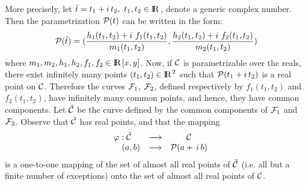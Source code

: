 More precisely, let $\bar{t}=t_1 + i\,t_{2},\,\, t_1,t_2 \in {\rm I\kern -2.2pt R\hskip 1pt}$, denote a 
generic complex number. Then the parametrization ${\cal P}(t)$ can be 
written in the form:
\[ {\cal P}(\tilde{t})=(\frac{h_{1}(t_1,t_2)+i\,\, 
f_{1}(t_1,t_2)}{m_{1}(t_1,t_2)}, \frac{h_{2}(t_1,t_2)+i\,\, 
f_{2}(t_1,t_2)}{m_{2}(t_1,t_2)}) \]
where $m_1,m_2,h_1,h_2,f_1,f_2 \in {\rm I\kern -2.2pt R\hskip 1pt}[x,y]$. Now, if ${\cal C}$ is 
parametrizable over the reals, there exist infinitely many  points 
$(t_1,t_2)\in {\rm I\kern -2.2pt R\hskip 1pt}^{2}$ such that ${\cal P}(t_1+i\,t_{2})$ is a real point 
on ${\cal C}$. Therefore 
the curves ${\cal F}_{1}$, ${\cal F}_{2}$, defined respectively by 
$f_{1}(t_1,t_2)$ and $f_{2}(t_1,t_2)$, have infinitely many common 
points, and hence, they have common components. Let  $\tilde{{\cal C}}$ 
be the curve defined by the common components of ${\cal F}_{1}$ and 
${\cal F}_{2}$. Observe that $\tilde{{\cal C}}$ has  real points, and that 
the mapping 
\[ \begin{array}{ccc}
\varphi:\tilde{{\cal C}} & \longrightarrow & {\cal C} \\ 
\,\,\,\,\,\,\,\,\,\,\,\,(a,b) &\longrightarrow & {\cal P}(a+ \,i \,b) 
\end{array} 
\]
is a one-to-one mapping  of the set of almost all  real points of 
$\tilde{{\cal C}}$ (i.e. all but a finite number of exceptions) onto 
the set of almost all  real points of ${\cal C}$.

